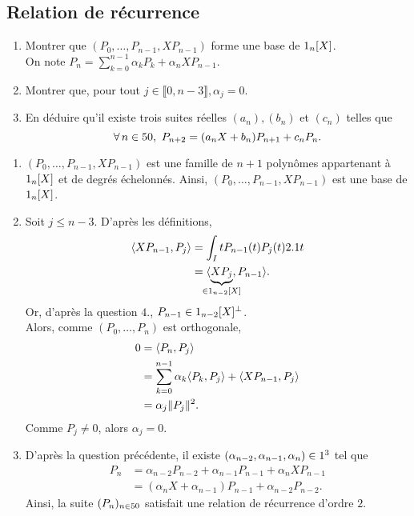 \subsection{Relation de récurrence}

\begin{exercice}
    \begin{enumerate}
        \item Montrer que $(P_0, \dots, P_{n-1}, X P_{n-1})$ forme une base de $1_n[X]$. \\
        On note $P_n = \sum\limits_{k=0}^{n-1} \alpha_k P_k + \alpha_n X P_{n-1}$.
        \item Montrer que, pour tout $j \in \llbracket 0, n - 3 \rrbracket, \alpha_j = 0$.
        \item En déduire qu'il existe trois suites réelles $(a_n), (b_n)$ et $(c_n)$ telles que 
        $$\forall n \in \N,\ P_{n+2} = (a_n X + b_n) P_{n+1} + c_n P_n.$$
    \end{enumerate}
\end{exercice}

\begin{solution}
    \begin{enumerate}
        \item $(P_0, \dots, P_{n-1}, X P_{n-1})$ est une famille de $n+1$ polynômes appartenant à $1_n[X]$ et de degrés échelonnés. Ainsi, $(P_0, \dots, P_{n-1}, X P_{n-1})$ est une base de $1_n[X]$.
        \item Soit $j \leqslant n-3$. D'après les définitions,
        \begin{align*}
            \langle X P_{n-1}, P_j \rangle &= \int_I t P_{n-1}(t) P_j(t) \d t \\
            &= \langle \underbrace{X P_j}_{\mathclap{\in \R_{n-2}[X]}}, P_{n-1} \rangle.
        \end{align*}
        Or, d'après la question $4.$, $P_{n-1} \in 1_{n-2}[X]^\perp$. \\
        Alors, comme $(P_0, \dots, P_n)$ est orthogonale,
        \begin{align*}
            0 &= \langle P_n, P_j \rangle \\
            &= \sum_{k=0}^{n-1} \alpha_k \langle P_k, P_j \rangle + \langle X P_{n-1}, P_j \rangle \\
            &= \alpha_j \Vert P_j \Vert^2.
        \end{align*}
        Comme $P_j \not= 0$, alors $\alpha_j = 0$.
        \item D'après la question précédente, il existe
        $(\alpha_{n-2}, \alpha_{n-1}, \alpha_n) \in 1^3$ tel que 
        \begin{align*}
            P_n &= \alpha_{n-2} P_{n-2} + \alpha_{n-1} P_{n-1} + \alpha_n X P_{n-1} \\
            &= (\alpha_n X + \alpha_{n-1}) P_{n-1} + \alpha_{n-2} P_{n-2}.
        \end{align*}
        Ainsi, la suite $(P_n)_{n \in 50}$ satisfait une relation de récurrence d'ordre $2$. 
    \end{enumerate}
\end{solution}

